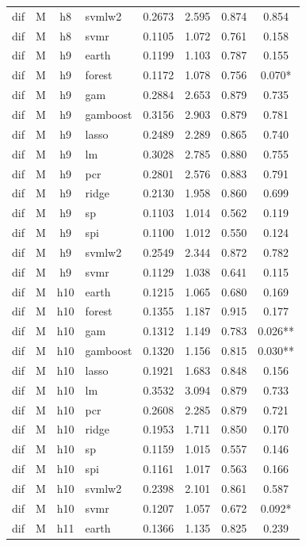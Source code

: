 \begin{ThreePartTable}
\begin{longtable}[t]{llclcccc}
dif & M & h8 & svmlw2 & 0.2673 & 2.595 & 0.874 & 0.854\\
dif & M & h8 & svmr & 0.1105 & 1.072 & 0.761 & 0.158\\
\addlinespace
dif & M & h9 & earth & 0.1199 & 1.103 & 0.787 & 0.155\\
dif & M & h9 & forest & 0.1172 & 1.078 & 0.756 & 0.070*\\
dif & M & h9 & gam & 0.2884 & 2.653 & 0.879 & 0.735\\
dif & M & h9 & gamboost & 0.3156 & 2.903 & 0.879 & 0.781\\
dif & M & h9 & lasso & 0.2489 & 2.289 & 0.865 & 0.740\\
dif & M & h9 & lm & 0.3028 & 2.785 & 0.880 & 0.755\\
dif & M & h9 & pcr & 0.2801 & 2.576 & 0.883 & 0.791\\
dif & M & h9 & ridge & 0.2130 & 1.958 & 0.860 & 0.699\\
dif & M & h9 & sp & 0.1103 & 1.014 & 0.562 & 0.119\\
dif & M & h9 & spi & 0.1100 & 1.012 & 0.550 & 0.124\\
dif & M & h9 & svmlw2 & 0.2549 & 2.344 & 0.872 & 0.782\\
dif & M & h9 & svmr & 0.1129 & 1.038 & 0.641 & 0.115\\
\addlinespace
dif & M & h10 & earth & 0.1215 & 1.065 & 0.680 & 0.169\\
dif & M & h10 & forest & 0.1355 & 1.187 & 0.915 & 0.177\\
dif & M & h10 & gam & 0.1312 & 1.149 & 0.783 & 0.026**\\
dif & M & h10 & gamboost & 0.1320 & 1.156 & 0.815 & 0.030**\\
dif & M & h10 & lasso & 0.1921 & 1.683 & 0.848 & 0.156\\
dif & M & h10 & lm & 0.3532 & 3.094 & 0.879 & 0.733\\
dif & M & h10 & pcr & 0.2608 & 2.285 & 0.879 & 0.721\\
dif & M & h10 & ridge & 0.1953 & 1.711 & 0.850 & 0.170\\
dif & M & h10 & sp & 0.1159 & 1.015 & 0.557 & 0.146\\
dif & M & h10 & spi & 0.1161 & 1.017 & 0.563 & 0.166\\
dif & M & h10 & svmlw2 & 0.2398 & 2.101 & 0.861 & 0.587\\
dif & M & h10 & svmr & 0.1207 & 1.057 & 0.672 & 0.092*\\
\addlinespace
dif & M & h11 & earth & 0.1366 & 1.135 & 0.825 & 0.239\\

\end{longtable}
\end{ThreePartTable}
